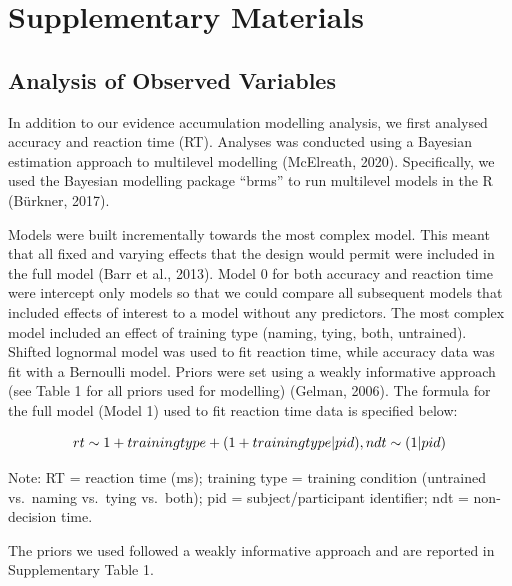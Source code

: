 \documentclass[
  man,floatsintext]{apa6}
\author{\phantom{0}}
\date{}
\affiliation{\phantom{0}}
\begin{document}
\section{Supplementary Materials}\label{supplementary-materials}

\subsection{Analysis of Observed Variables}\label{analysis-of-observed-variables}

In addition to our evidence accumulation modelling analysis, we first analysed accuracy and reaction time (RT). Analyses was conducted using a Bayesian estimation approach to multilevel modelling (McElreath, 2020). Specifically, we used the Bayesian modelling package ``brms'' to run multilevel models in the R (Bürkner, 2017).

Models were built incrementally towards the most complex model. This meant that all fixed and varying effects that the design would permit were included in the full model (Barr et al., 2013). Model 0 for both accuracy and reaction time were intercept only models so that we could compare all subsequent models that included effects of interest to a model without any predictors. The most complex model included an effect of training type (naming, tying, both, untrained). Shifted lognormal model was used to fit reaction time, while accuracy data was fit with a Bernoulli model. Priors were set using a weakly informative approach (see Table 1 for all priors used for modelling) (Gelman, 2006). The formula for the full model (Model 1) used to fit reaction time data is specified below:

\[rt \sim 1 + training type + \\
(1 + training type | pid), \\
ndt \sim (1 | pid)\]

Note: RT = reaction time (ms); training type = training condition (untrained vs.~naming vs.~tying vs.~both); pid = subject/participant identifier; ndt = non-decision time.

The priors we used followed a weakly informative approach and are reported in Supplementary Table 1.
\end{document}
